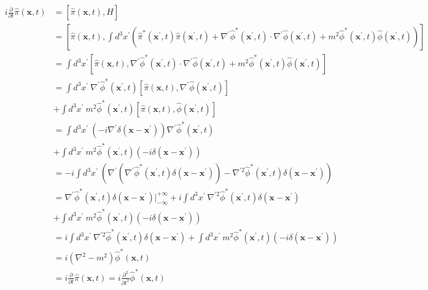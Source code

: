 \documentclass{article}
\begin{document}
\begin{align} \:
i \frac{\partial}{\partial t} \hat{\pi}(\mathbf{x},t) 
	&=\left[ \hat{\pi}(\mathbf{x},t),\hat{H} \right] \nonumber \\
	&=\left[ \hat{\pi}(\mathbf{x},t),\int d^3 x^{\prime} \left(\hat{\pi}^{*}(\mathbf{x^{\prime}},t) \hat{\pi}(\mathbf{x^{\prime}},t)+ \nabla^{\prime} \hat{\phi}^{*}(\mathbf{x^{\prime}},t) \cdot \nabla^{\prime} \hat{\phi}(\mathbf{x^{\prime}},t) + m^2 \hat{\phi}^{*}(\mathbf{x^{\prime}},t)\hat{\phi}(\mathbf{x^{\prime}},t) \right) \right] \nonumber \\
	&=\int d^3 x^{\prime} \left[ \hat{\pi}(\mathbf{x},t),\nabla^{\prime} \hat{\phi}^{*}(\mathbf{x^{\prime}},t) \cdot \nabla^{\prime} \hat{\phi}(\mathbf{x^{\prime}},t) + m^2 \hat{\phi}^{*}(\mathbf{x^{\prime}},t)\hat{\phi}(\mathbf{x^{\prime}},t) \right] \nonumber \\
	&=\int d^3 x^{\prime} \: \nabla^{\prime} \hat{\phi}^{*}(\mathbf{x^{\prime}},t)  \left[ \hat{\pi}(\mathbf{x},t),\nabla^{\prime} \hat{\phi}(\mathbf{x^{\prime}},t) \right] \nonumber \\
	&+ \int d^3 x^{\prime}  \: m^2 \hat{\phi}^{*}(\mathbf{x^{\prime}},t) \left[ \hat{\pi}(\mathbf{x},t), \hat{\phi}(\mathbf{x^{\prime}},t) \right] \nonumber \\
	&= \int d^3 x^{\prime} \: \left(
			-i \nabla^{\prime} \delta(\mathbf{x}-\mathbf{x}^{\prime})
		\right)\nabla^{\prime} \hat{\phi}^{*}(\mathbf{x^{\prime}},t) \nonumber \\
	&+ \int d^3 x^{\prime} \: m^2 \hat{\phi}^{*}(\mathbf{x^{\prime}},t) (-i \delta(\mathbf{x}-\mathbf{x}^{\prime})) \nonumber \\
	&= -i\int d^3 x^{\prime} \: \left(
			\nabla^{\prime}(\nabla^{\prime} \hat{\phi}^{*}(\mathbf{x^{\prime}},t) \delta(\mathbf{x}-\mathbf{x}^{\prime})) - \nabla^{\prime 2} \hat{\phi}^{*}(\mathbf{x^{\prime}},t) \delta(\mathbf{x}-\mathbf{x}^{\prime})
	\right) \nonumber \\
	&=\nabla^{\prime} \hat{\phi}^{*}(\mathbf{x^{\prime}},t) \delta(\mathbf{x}-\mathbf{x}^{\prime}) |^{+\infty}_{-\infty} +i\int d^3 x^{\prime} \: \nabla^{\prime 2} \hat{\phi}^{*}(\mathbf{x^{\prime}},t) \delta(\mathbf{x}-\mathbf{x}^{\prime}) \nonumber \\
	&+ \int d^3 x^{\prime} \: m^2 \hat{\phi}^{*}(\mathbf{x^{\prime}},t) (-i \delta(\mathbf{x}-\mathbf{x}^{\prime})) \nonumber \\
	&=i\int d^3 x^{\prime} \: \nabla^{\prime 2} \hat{\phi}^{*}(\mathbf{x^{\prime}},t) \delta(\mathbf{x}-\mathbf{x}^{\prime}) \nonumber +\int d^3 x^{\prime} \: m^2 \hat{\phi}^{*}(\mathbf{x^{\prime}},t) (-i \delta(\mathbf{x}-\mathbf{x}^{\prime})) \nonumber \\
	&= i \left(
		\nabla^2 - m^2
	\right) \hat{\phi}^{*}(\mathbf{x},t) \nonumber \\
	&=i \frac{\partial}{\partial t} \hat{\pi}(\mathbf{x},t)
	= i \frac{\partial^2}{\partial t^2} \hat{\phi}^{*}(\mathbf{x},t) \nonumber 
\end{align}
\end{document}

